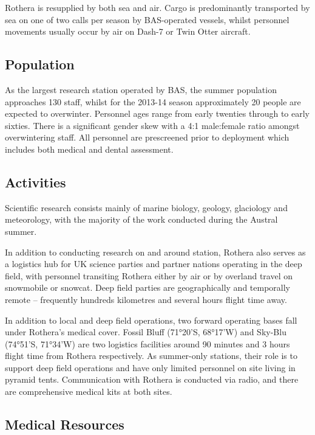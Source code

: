 \documentclass[12pt,a4paper]{article}
\begin{document}
Rothera is resupplied by both sea and air. Cargo is predominantly transported by sea on one of two calls per season by BAS-operated vessels, whilst personnel movements usually occur by air on Dash-7 or Twin Otter aircraft.

\subsection{Population}

As the largest research station operated by BAS, the summer population approaches 130 staff, whilst for the 2013-14 season approximately 20 people are expected to overwinter. Personnel ages range from early twenties through to early sixties. There is a significant gender skew with a 4:1 male:female ratio amongst overwintering staff. All personnel are prescreened prior to deployment which includes both medical and dental assessment.

\subsection{Activities}

 Scientific research consists mainly of marine biology, geology, glaciology and meteorology, with the majority of the work conducted during the Austral summer.

In addition to conducting research on and around station, Rothera also serves as a logistics hub for UK science parties and partner nations operating in the deep field, with personnel transiting Rothera either by air or by overland travel on snowmobile or snowcat. Deep field parties are geographically and temporally remote -- frequently hundreds kilometres and several hours flight time away.

In addition to local and deep field operations, two forward operating bases fall under Rothera's medical cover. Fossil Bluff (71°20'S, 68°17'W) and Sky-Blu (74°51'S, 71°34'W) are two logistics facilities around 90 minutes and 3 hours flight time from Rothera respectively. As summer-only stations, their role is to support deep field operations and have only limited personnel on site living in pyramid tents. Communication with Rothera is conducted via radio, and there are comprehensive medical kits at both sites.

\subsection{Medical Resources}
\end{document}

